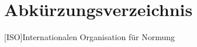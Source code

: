 
\chapter{Abkürzungsverzeichnis}
%	
\begin{acronym}
	
	[ISO]{Internationalen Organisation für Normung}
		
\end{acronym}


